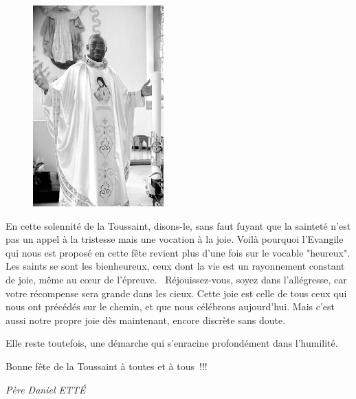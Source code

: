 \begin{figure}
\vspace{-0.2cm}
	\includegraphics[scale=1.20]{../images/standing_daniel}
\end{figure}
En cette solennité de la Toussaint, disons-le, sans faut fuyant que la sainteté n’est pas un appel à la tristesse mais une vocation à la joie. Voilà pourquoi l’Evangile qui nous est proposé en cette fête revient plus d’une fois sur le vocable "heureux". Les saints se sont les bienheureux, ceux dont la vie est un rayonnement constant de joie, même au cœur de l’épreuve. \og Réjouissez-vous, soyez dans l’allégresse, car votre récompense sera grande dans les cieux. \fg{} Cette joie est celle de tous ceux qui nous ont précédés sur le chemin, et que nous célébrons aujourd’hui. Mais c’est aussi notre propre joie dès maintenant, encore discrète sans doute.

 Elle reste toutefois, une démarche qui s’enracine profondément dans l’humilité.


\begin{center}
Bonne fête de la Toussaint à toutes et à tous !!!
\end{center}


\begin{flushright}
\textit{Père  Daniel  ETTÉ}
\end{flushright}

